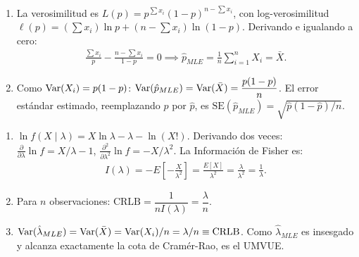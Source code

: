 \begin{solproblema}
	\begin{enumerate}
		\item La verosimilitud es $L(p) = p^{\sum x_i}(1-p)^{n-\sum x_i}$, con log-verosimilitud $\ell(p) = (\sum x_i)\ln p + (n-\sum x_i)\ln(1-p)$. Derivando e igualando a cero:
		\begin{align}
			\frac{\sum x_i}{p} - \frac{n-\sum x_i}{1-p} = 0 \implies \hat{p}_{MLE} = \frac{1}{n}\sum_{i=1}^n X_i = \bar{X}.
		\end{align}
		\item Como $\operatorname{Var}(X_i)=p(1-p)$: $\operatorname{Var}(\hat{p}_{MLE}) = \operatorname{Var}(\bar{X}) = \dfrac{p(1-p)}{n}$. El error estándar estimado, reemplazando $p$ por $\hat{p}$, es $\text{SE}(\hat{p}_{MLE}) = \sqrt{\hat{p}(1-\hat{p})/n}$.
	\end{enumerate}
\end{solproblema}

\begin{solproblema}[prob:977b8dd]
	\begin{enumerate}
		\item $\ln f(X\mid\lambda) = X\ln\lambda-\lambda-\ln(X!)$. Derivando dos veces: $\frac{\partial}{\partial\lambda}\ln f = X/\lambda-1$, $\frac{\partial^2}{\partial\lambda^2}\ln f = -X/\lambda^2$. La Información de Fisher es:
		\begin{align}
			I(\lambda) = -E\left[-\frac{X}{\lambda^2}\right] = \frac{E[X]}{\lambda^2} = \frac{\lambda}{\lambda^2} = \frac{1}{\lambda}.
		\end{align}
		\item Para $n$ observaciones: $\text{CRLB} = \dfrac{1}{nI(\lambda)} = \dfrac{\lambda}{n}$.
		\item $\operatorname{Var}(\hat{\lambda}_{MLE}) = \operatorname{Var}(\bar{X}) = \operatorname{Var}(X_i)/n = \lambda/n \equiv \text{CRLB}$. Como $\hat{\lambda}_{MLE}$ es insesgado y alcanza exactamente la cota de Cramér-Rao, es el UMVUE.
	\end{enumerate}
\end{solproblema}

